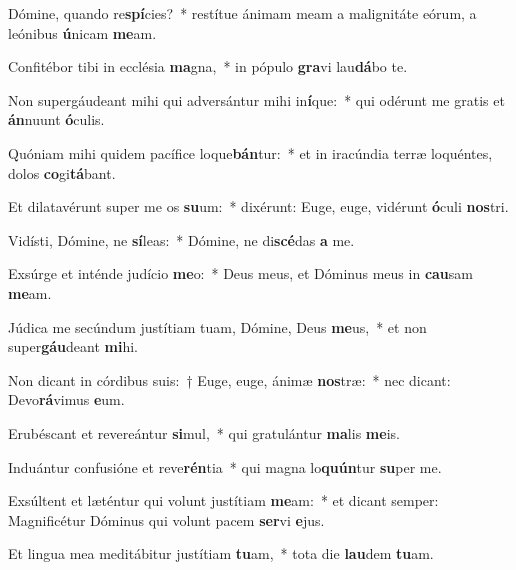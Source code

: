 \item Dómine, quando re\textbf{spí}cies?~* restítue ánimam meam a malignitáte eórum, a leónibus \textbf{ú}nicam \textbf{me}am.
\item Confitébor tibi in ecclésia \textbf{ma}gna,~* in pópulo \textbf{gra}vi lau\textbf{dá}bo te.
\item Non supergáudeant mihi qui adversántur mihi in\textbf{í}que:~* qui odérunt me gratis et \textbf{án}nuunt \textbf{ó}culis.
\item Quóniam mihi quidem pacífice loque\textbf{bán}tur:~* et in iracúndia terræ loquéntes, dolos \textbf{co}gi\textbf{tá}bant.
\item Et dilatavérunt super me os \textbf{su}um:~* dixérunt: Euge, euge, vidérunt \textbf{ó}culi \textbf{nos}tri.
\item Vidísti, Dómine, ne \textbf{sí}leas:~* Dómine, ne di\textbf{scé}das \textbf{a} me.
\item Exsúrge et inténde judício \textbf{me}o:~* Deus meus, et Dóminus meus in \textbf{cau}sam \textbf{me}am.
\item Júdica me secúndum justítiam tuam, Dómine, Deus \textbf{me}us,~* et non super\textbf{gáu}deant \textbf{mi}hi.
\item Non dicant in córdibus suis:~† Euge, euge, ánimæ \textbf{nos}træ:~* nec dicant: Devo\textbf{rá}vimus \textbf{e}um.
\item Erubéscant et revereántur \textbf{si}mul,~* qui gratulántur \textbf{ma}lis \textbf{me}is.
\item Induántur confusióne et reve\textbf{rén}tia~* qui magna lo\textbf{quún}tur \textbf{su}per me.
\item Exsúltent et læténtur qui volunt justítiam \textbf{me}am:~* et dicant semper: Magnificétur Dóminus qui volunt pacem \textbf{ser}vi \textbf{e}jus.
\item Et lingua mea meditábitur justítiam \textbf{tu}am,~* tota die \textbf{lau}dem \textbf{tu}am.
